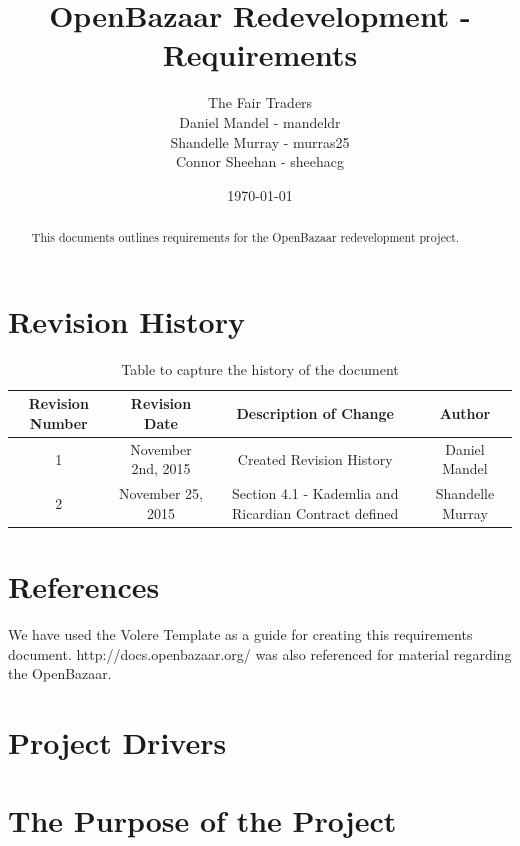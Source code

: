 \documentclass{article}
\begin{document}
\title{OpenBazaar Redevelopment - Requirements}
\author{The Fair Traders \\ Daniel Mandel - mandeldr \\ Shandelle Murray - murras25 \\ Connor Sheehan - sheehacg}
\date{\today}
\maketitle
\begin{abstract}
This documents outlines requirements for the OpenBazaar redevelopment project.
\end{abstract}
\newpage
\tableofcontents
\newpage
{}
\section*{Revision History}
\begin{table}[h!]
\centering
\begin{tabular}{||c c c c||} 
 \hline
 Revision Number & Revision Date & Description of Change & Author \\ [0.5ex] 
 \hline\hline
 1 & November 2nd, 2015 & Created Revision History & Daniel Mandel \\ [1ex] 
 \hline
 2 & November 25, 2015 & Section 4.1 - Kademlia and Ricardian Contract defined  & Shandelle Murray \\ [1ex]
 \hline
\end{tabular}
\caption{Table to capture the history of the document}
\label{table:1}
\end{table}
\section*{References}
We have used the Volere Template as a guide for creating this requirements document.\newline
\newline
http://docs.openbazaar.org/ was also referenced for material regarding the OpenBazaar.
\section*{Project Drivers}
\section{The Purpose of the Project}
\end{document}
